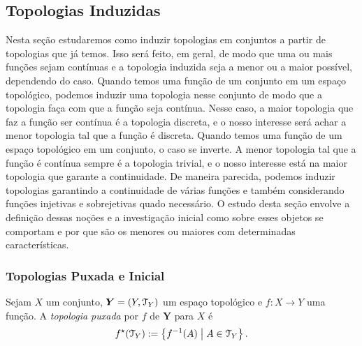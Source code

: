 \subsection{Topologias Induzidas}

Nesta seção estudaremos como induzir topologias em conjuntos a partir de topologias que já temos. Isso será feito, em geral, de modo que uma ou mais funções sejam contínuas e a topologia induzida seja a menor ou a maior possível, dependendo do caso. Quando temos uma função de um conjunto em um espaço topológico, podemos induzir uma topologia nesse conjunto de modo que a topologia faça com  que a função seja contínua. Nesse caso, a maior topologia que faz a função ser contínua é a topologia discreta, e o nosso interesse será achar a menor topologia tal que a função é discreta. Quando temos uma função de um espaço topológico em um conjunto, o caso se inverte. A menor topologia tal que a função é contínua sempre é a topologia trivial, e o nosso interesse está na maior topologia que garante a continuidade. De maneira parecida, podemos induzir topologias garantindo a continuidade de várias funções e também considerando funções injetivas e sobrejetivas quado necessário. O estudo desta seção envolve a definição dessas noções e a investigação inicial como sobre esses objetos se comportam e por que são os menores ou maiores com determinadas características.

\subsubsection{Topologias Puxada e Inicial}

\begin{defi}
Sejam $X$ um conjunto, $\bm Y = (Y,\mathcal{T}_Y)$ um espaço topológico e $f: X \to Y$ uma função. A \emph{topologia puxada} por $f$ de $\bm Y$ para $X$ é
	\begin{equation*}
	f^\star(\mathcal{T}_Y) := \left\{f^{-1}(A) \;\middle\vert\; A \in \mathcal{T}_Y \right\}.
	\end{equation*}
\end{defi}

